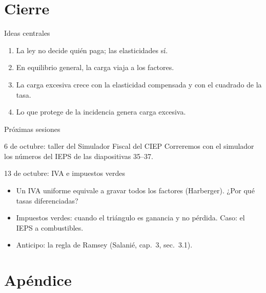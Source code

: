 \documentclass[aspectratio=169,11pt]{beamer}
\begin{document}
\section{Cierre}

\begin{frame}{Ideas centrales}
  \begin{enumerate}
    \item La ley no decide quién paga; las elasticidades sí.
    \item En equilibrio general, la carga viaja a los factores.
    \item La carga excesiva crece con la elasticidad compensada y con el cuadrado de la tasa.
    \item Lo que protege de la incidencia genera carga excesiva.
  \end{enumerate}
\end{frame}

\begin{frame}{Próximas sesiones}
  \begin{block}{6 de octubre: taller del Simulador Fiscal del CIEP}
    Correremos con el simulador los números del IEPS de las diapositivas 35–37.
  \end{block}
  \begin{block}{13 de octubre: IVA e impuestos verdes}
    \begin{itemize}
      \item Un IVA uniforme equivale a gravar todos los factores (Harberger). ¿Por qué tasas diferenciadas?
      \item Impuestos verdes: cuando el triángulo es ganancia y no pérdida. Caso: el IEPS a combustibles.
      \item Anticipo: la regla de Ramsey (Salanié, cap.~3, sec.~3.1).
    \end{itemize}
  \end{block}
\end{frame}

\appendix
\section{Apéndice}
\end{document}
